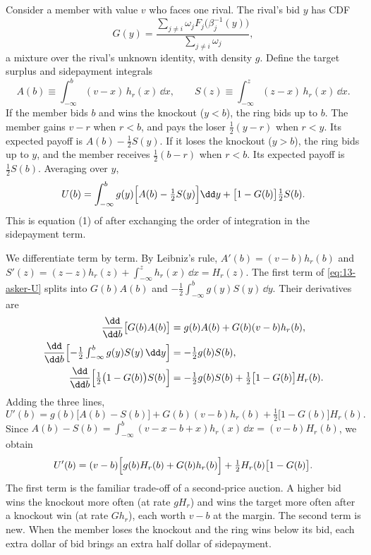 Consider a member with value $v$ who faces one rival. The rival's bid $y$ has CDF
\[
G(y)=\frac{\sum_{j\neq i}\omega_j F_j\bigl(\beta_j^{-1}(y)\bigr)}{\sum_{j\neq i}\omega_j},
\]
a mixture over the rival's unknown identity, with density $g$. Define the target surplus and sidepayment
integrals
\begin{equation}\label{eq:13-asker-AS}
A(b)\equiv\int_{-\infty}^{b}(v-x)\,h_r(x)\,\dd x,\qquad S(z)\equiv\int_{-\infty}^{z}(z-x)\,h_r(x)\,\dd x .
\end{equation}
If the member bids $b$ and wins the knockout ($y<b$), the ring bids up to $b$. The member gains $v-r$ when
$r<b$, and pays the loser $\frac{1}{2}(y-r)$ when $r<y$. Its expected payoff is $A(b)-\frac{1}{2}S(y)$. If it
loses the knockout ($y>b$), the ring bids up to $y$, and the member receives $\frac{1}{2}(b-r)$ when $r<b$.
Its expected payoff is $\frac{1}{2}S(b)$. Averaging over $y$,
\begin{equation}\label{eq:13-asker-U}
U(b)=\int_{-\infty}^{b}g(y)\Bigl[A(b)-\tfrac{1}{2}S(y)\Bigr]\dd y+\bigl[1-G(b)\bigr]\tfrac{1}{2}S(b).
\end{equation}
This is equation (1) of \citet{Asker2010} after exchanging the order of integration in the sidepayment term.

We differentiate term by term. By Leibniz's rule, $A'(b)=(v-b)h_r(b)$ and
$S'(z)=(z-z)h_r(z)+\int_{-\infty}^{z}h_r(x)\,\dd x=H_r(z)$. The first term of \eqref{eq:13-asker-U}
splits into $G(b)A(b)$ and $-\frac{1}{2}\int_{-\infty}^{b}g(y)S(y)\,\dd y$. Their derivatives are
\begin{align*}
\frac{\dd}{\dd b}\bigl[G(b)A(b)\bigr]&=g(b)A(b)+G(b)(v-b)h_r(b),\\
\frac{\dd}{\dd b}\Bigl[-\tfrac{1}{2}\textstyle\int_{-\infty}^{b}g(y)S(y)\,\dd y\Bigr]&=-\tfrac{1}{2}g(b)S(b),\\
\frac{\dd}{\dd b}\Bigl[\tfrac{1}{2}\bigl(1-G(b)\bigr)S(b)\Bigr]&=-\tfrac{1}{2}g(b)S(b)+\tfrac{1}{2}\bigl[1-G(b)\bigr]H_r(b).
\end{align*}
Adding the three lines,
\[
U'(b)=g(b)\bigl[A(b)-S(b)\bigr]+G(b)(v-b)h_r(b)+\tfrac{1}{2}\bigl[1-G(b)\bigr]H_r(b).
\]
Since $A(b)-S(b)=\int_{-\infty}^{b}(v-x-b+x)h_r(x)\,\dd x=(v-b)H_r(b)$, we obtain
\begin{equation}\label{eq:13-asker-foc}
U'(b)=(v-b)\Bigl[g(b)H_r(b)+G(b)h_r(b)\Bigr]+\tfrac{1}{2}H_r(b)\bigl[1-G(b)\bigr].
\end{equation}
The first term is the familiar trade-off of a second-price auction. A higher bid wins the knockout more often
(at rate $gH_r$) and wins the target more often after a knockout win (at rate $Gh_r$), each worth $v-b$ at the
margin. The second term is new. When the member loses the knockout and the ring wins below its bid, each extra
dollar of bid brings an extra half dollar of sidepayment.

